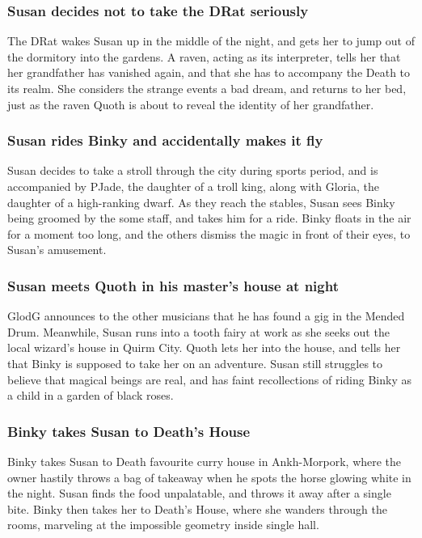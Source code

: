 \subsubsection{\Gls{Susan} decides not to take the \Gls{DRat} seriously}
The \Gls{DRat} wakes \Gls{Susan} up in the middle of the night, and gets her to jump out of the
dormitory into the gardens. A raven, acting as its interpreter, tells her that her grandfather
has vanished again, and that she has to accompany the \Gls{Death} to its realm. She considers the
strange events a bad dream, and returns to her bed, just as the raven \Gls{Quoth} is about to reveal
the identity of her grandfather.

\subsubsection{\Gls{Susan} rides \Gls{Binky} and accidentally makes it fly}
\Gls{Susan} decides to take a stroll through the city during sports period, and is accompanied by
\Gls{PJade}, the daughter of a troll king, along with \Gls{Gloria}, the daughter of a high-ranking
dwarf. As they reach the stables, \Gls{Susan} sees \Gls{Binky} being groomed by the some staff,
and takes him for a ride. \Gls{Binky} floats in the air for a moment too long, and the others
dismiss the magic in front of their eyes, to \Gls{Susan}'s amusement.

\subsubsection{\Gls{Susan} meets \Gls{Quoth} in his master's house at night}
\Gls{GlodG} announces to the other musicians that he has found a gig in the Mended Drum. Meanwhile,
\Gls{Susan} runs into a tooth fairy at work as she seeks out the local wizard's house in Quirm City. \Gls{Quoth} lets her into the house, and
tells her that \Gls{Binky} is supposed to take her on an adventure. \Gls{Susan} still struggles to
believe that magical beings are real, and has faint recollections of riding \Gls{Binky} as a child
in a garden of black roses.

\subsubsection{\Gls{Binky} takes \Gls{Susan} to \Gls{Death}'s House}
\Gls{Binky} takes \Gls{Susan} to \Gls{Death} favourite curry house in Ankh-Morpork, where the
owner hastily throws a bag of takeaway when he spots the horse glowing white in the night.
\Gls{Susan} finds the food unpalatable, and throws it away after a single bite. \Gls{Binky} then
takes her to \Gls{Death}'s House, where she wanders through the rooms, marveling at the impossible
geometry inside single hall.

